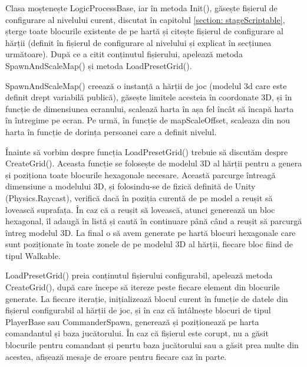 \documentclass[12pt, a4paper]{article}
\begin{document}
	Clasa moștenește LogicProcessBase, iar în metoda Init(), găsește fișierul de configurare al nivelului curent, discutat în capitolul \ref{section: stageScriptable}, șterge toate blocurile existente de pe hartă și citește fișierul de configurare al hărții (definit în fișierul de configurare al nivelului și explicat în secțiunea următoare). După ce a citit conținutul fișierului, apelează metoda SpawnAndScaleMap() și metoda LoadPresetGrid().
	\newline
	
	SpawnAndScaleMap() creează o instanță a hărții de joc (modelul 3d care este definit drept variabilă publică), găsește limitele acesteia în coordonate 3D, și în funcție de dimensiunea ecranului, scalează harta în așa fel încât să încapă harta în întregime pe ecran. Pe urmă, în funcție de mapScaleOffset, scaleaza din nou harta în funcție de dorința persoanei care a definit nivelul.
	\newline
	
	Înainte să vorbim despre funcția LoadPresetGrid() trebuie să discutăm despre CreateGrid(). Aceasta funcție se folosește de modelul 3D al hărții pentru a genera și poziționa toate blocurile hexagonale necesare. Această parcurge întreagă dimensiune a modelului 3D, și folosindu-se de fizică definită de Unity (Physics.Raycast), verifică dacă în poziția curentă de pe model a reușit să lovească suprafața. În caz că a reușit să lovească, atunci generează un bloc hexagonal, îl adaugă în listă și caută în continuare până când a reușit să parcurgă întreg modelul 3D. La final o să avem generate pe hartă blocuri hexagonale care sunt poziționate în toate zonele de pe modelul 3D al hărții, fiecare bloc fiind de tipul Walkable.
	\newline
	
	LoadPresetGrid() preia conținutul fișierului configurabil, apelează metoda CreateGrid(), după care începe să itereze peste fiecare element din blocurile generate. La fiecare iterație, inițializează blocul curent în funcție de datele din fișierul configurabil al hărții de joc, și în caz că întâlnește blocuri de tipul PlayerBase sau CommanderSpawn, generează și poziționează pe harta comandantul și baza jucătorului. În caz că fișierul este corupt, nu a găsit blocurile pentru comandant și penrtu baza jucătorului sau a găsit prea multe din acestea, afișează mesaje de eroare pentru fiecare caz în parte.
	\newline
	
	
	
	
	
\end{document}
